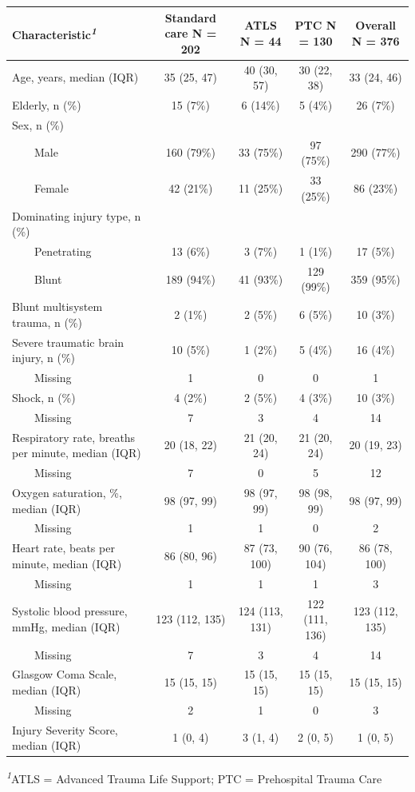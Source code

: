 \documentclass[
]{article}
\begin{document}
\begingroup
\fontsize{12.0pt}{14.4pt}\selectfont
\setlength{\LTpost}{0mm}
\begin{longtable}{lcccc}
\toprule
\textbf{Characteristic}\textsuperscript{\textit{1}} & \textbf{Standard care}  N = 202 & \textbf{ATLS}  N = 44 & \textbf{PTC}  N = 130 & \textbf{Overall}  N = 376 \\ 
\midrule\addlinespace[2.5pt]
Age, years, median (IQR) & 35 (25, 47) & 40 (30, 57) & 30 (22, 38) & 33 (24, 46) \\ 
Elderly, n (\%) & 15 (7\%) & 6 (14\%) & 5 (4\%) & 26 (7\%) \\ 
Sex, n (\%) &  &  &  &  \\ 
    Male & 160 (79\%) & 33 (75\%) & 97 (75\%) & 290 (77\%) \\ 
    Female & 42 (21\%) & 11 (25\%) & 33 (25\%) & 86 (23\%) \\ 
Dominating injury type, n (\%) &  &  &  &  \\ 
    Penetrating & 13 (6\%) & 3 (7\%) & 1 (1\%) & 17 (5\%) \\ 
    Blunt & 189 (94\%) & 41 (93\%) & 129 (99\%) & 359 (95\%) \\ 
Blunt multisystem trauma, n (\%) & 2 (1\%) & 2 (5\%) & 6 (5\%) & 10 (3\%) \\ 
Severe traumatic brain injury, n (\%) & 10 (5\%) & 1 (2\%) & 5 (4\%) & 16 (4\%) \\ 
    Missing & 1 & 0 & 0 & 1 \\ 
Shock, n (\%) & 4 (2\%) & 2 (5\%) & 4 (3\%) & 10 (3\%) \\ 
    Missing & 7 & 3 & 4 & 14 \\ 
Respiratory rate, breaths per minute, median (IQR) & 20 (18, 22) & 21 (20, 24) & 21 (20, 24) & 20 (19, 23) \\ 
    Missing & 7 & 0 & 5 & 12 \\ 
Oxygen saturation, \%, median (IQR) & 98 (97, 99) & 98 (97, 99) & 98 (98, 99) & 98 (97, 99) \\ 
    Missing & 1 & 1 & 0 & 2 \\ 
Heart rate, beats per minute, median (IQR) & 86 (80, 96) & 87 (73, 100) & 90 (76, 104) & 86 (78, 100) \\ 
    Missing & 1 & 1 & 1 & 3 \\ 
Systolic blood pressure, mmHg, median (IQR) & 123 (112, 135) & 124 (113, 131) & 122 (111, 136) & 123 (112, 135) \\ 
    Missing & 7 & 3 & 4 & 14 \\ 
Glasgow Coma Scale, median (IQR) & 15 (15, 15) & 15 (15, 15) & 15 (15, 15) & 15 (15, 15) \\ 
    Missing & 2 & 1 & 0 & 3 \\ 
Injury Severity Score, median (IQR) & 1 (0, 4) & 3 (1, 4) & 2 (0, 5) & 1 (0, 5) \\ 
\bottomrule
\end{longtable}
\begin{minipage}{\linewidth}
\textsuperscript{\textit{1}}ATLS = Advanced Trauma Life Support; PTC = Prehospital Trauma Care\\
\end{minipage}
\endgroup
\end{document}
